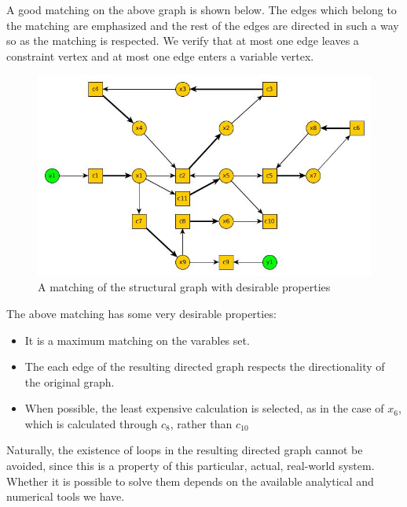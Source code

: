 A good matching on the above graph is shown below. The edges which belong to the matching are emphasized and the rest of the edges are directed in such a way so as the matching is respected. We verify that at most one edge leaves a constraint vertex and at most one edge enters a variable vertex.

\begin{figure}[H]
\centering
\includegraphics[width=0.7\linewidth]{Figures/matchedConstrGraph}
\caption{A matching of the structural graph with desirable properties}
\label{fig:matchingConstraints}
\end{figure}

The above matching has some very desirable properties:
\begin{itemize}
\item It is a maximum matching on the varables set.
\item The each edge of the resulting directed graph respects the directionality of the original graph.
\item When possible, the least expensive calculation is selected, as in the case of $x_6$, which is calculated through $c_8$, rather than $c_{10}$
\end{itemize}

Naturally, the existence of loops in the resulting directed graph cannot be avoided, since this is a property of this particular, actual, real-world system. Whether it is possible to solve them depends on the available analytical and numerical tools we have.